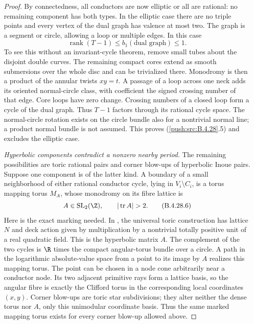 \begin{proof}
By connectedness, all conductors are now elliptic or
all are rational: no remaining component has both
types. In the elliptic case there are no triple points
and every vertex of the dual graph has valence at most
two. The graph is a segment or circle, allowing a loop
or multiple edges. In this case
\[
 \operatorname{rank}(T-1)\le b_1(\text{dual graph})
 \le1.                                               \tag{B.4.28.5}
\]
To see this without an invariant-cycle theorem, remove
small tubes about the disjoint double curves. The
remaining compact cores extend as smooth submersions
over the whole disc and can be trivialized there.
Monodromy is then a product of the annular twists
$xy=t$. A passage of a loop across one neck adds its
oriented normal-circle class, with coefficient the
signed crossing number of that edge. Core loops have
zero change. Crossing numbers of a closed loop form a
cycle of the dual graph. Thus $T-1$ factors through its
rational cycle space. The normal-circle rotation exists
on the circle bundle also for a nontrivial normal line;
a product normal bundle is not assumed. This proves
(\ref{push:src:B.4.28}.5) and excludes the elliptic case.

\emph{Hyperbolic components contradict a nonzero nearby period.}
The remaining possibilities are toric rational pairs
and corner blow-ups of hyperbolic Inoue pairs. Suppose
one component is of the latter kind. A boundary of a
small neighborhood of either rational conductor cycle,
lying in $V_i\setminus C_i$, is a torus mapping torus
$M_A$, whose monodromy on its fibre lattice is
\[
 A\in\operatorname{SL}_2(\Z),\qquad
 |\operatorname{tr}A|>2.                             \tag{B.4.28.6}
\]
Here is the exact marking needed. In
\citet[Section 15, Theorem 15.1 and the following
paragraph, pp.~130--131]{Oda1978D}, the universal
toric construction has lattice $N$ and deck action
given by multiplication by a nontrivial totally
positive unit of a real quadratic field. This is
the hyperbolic matrix $A$. The complement of the
two cycles is $\R$ times the compact angular-torus
bundle over a circle. A path in the logarithmic
absolute-value space from a point to its image by
$A$ realizes this mapping torus. The point can be
chosen in a node cone arbitrarily near a conductor
node. Its two adjacent primitive rays form a lattice
basis, so the angular fibre is exactly the Clifford
torus in the corresponding local coordinates
$(x,y)$. Corner blow-ups are toric star subdivisions;
they alter neither the dense torus nor $A$, only
this unimodular coordinate basis. Thus the same
marked mapping torus exists for every corner
blow-up allowed above.


\end{proof}
